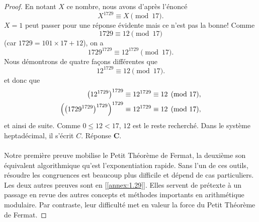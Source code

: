 \begin{proof}
En notant $X$ ce nombre, nous avons d'après l'énoncé
%
\begin{equation}
    X^{1729} \equiv X \pmod{17}.
  \end{equation}
%
$X=1$ peut passer pour une réponse évidente mais ce n'est pas la bonne! Comme 
%
\begin{equation}
  1729 \equiv 12 \pmod{17}
\end{equation}
%
(car $1729=101\times 17+12$), on a %
%
\begin{equation}
  1729^{1729} \equiv 12^{1729} \pmod{17}.
\end{equation}
%
Nous démontrons de quatre façons différentes que 
%
\begin{equation}
  12^{1729}\equiv 12 \pmod{17}.
\end{equation}
%
et donc que 
%
\begin{align}
    \bigl(12^{1729}\bigr)^{1729} &\equiv 12^{1729} \equiv 12 \pmod{17}, \\
    \Bigl(\bigl(1729^{1729}\bigr)^{1729}\Bigr)^{1729} &\equiv 12^{1729} \equiv 12 \pmod{17},
\end{align}
%
et ainsi de suite. Comme $0 \leq 12 <17$, $12$ est le reste recherché. Dans le système heptadécimal, il s'écrit $C$. Réponse %
\textbf{C}.\\
\\
Notre première preuve mobilise le Petit Théorème de Fermat, la deuxième son équivalent algorithmique qu'est l'exponentiation %
rapide. Sans l'un de ces outils, résoudre les congruences est beaucoup plus difficile et dépend de cas particuliers. Les deux %
autres preuves sont en [\ref{annex:1.29}]. Elles servent de prétexte à un passage en revue des autres concepts et méthodes %
importants en arithmétique modulaire. Par contraste, leur difficulté met en valeur la force du Petit Théorème de Fermat.
%

\end{proof}
